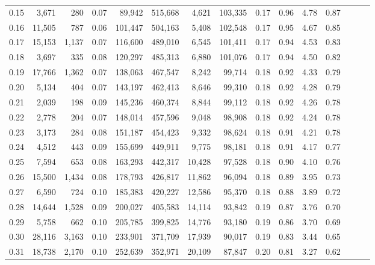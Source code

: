 \begin{tabular}{rrrrrrrrrrrrrrr}
0.15 &   3,671 &    280 &  0.07 &   89,942 &  515,668 &    4,621 &  103,335 &  0.17 &  0.96 &  4.78 &      0.87 \\
0.16 &  11,505 &    787 &  0.06 &  101,447 &  504,163 &    5,408 &  102,548 &  0.17 &  0.95 &  4.67 &      0.85 \\
0.17 &  15,153 &  1,137 &  0.07 &  116,600 &  489,010 &    6,545 &  101,411 &  0.17 &  0.94 &  4.53 &      0.83 \\
0.18 &   3,697 &    335 &  0.08 &  120,297 &  485,313 &    6,880 &  101,076 &  0.17 &  0.94 &  4.50 &      0.82 \\
0.19 &  17,766 &  1,362 &  0.07 &  138,063 &  467,547 &    8,242 &   99,714 &  0.18 &  0.92 &  4.33 &      0.79 \\
0.20 &   5,134 &    404 &  0.07 &  143,197 &  462,413 &    8,646 &   99,310 &  0.18 &  0.92 &  4.28 &      0.79 \\
0.21 &   2,039 &    198 &  0.09 &  145,236 &  460,374 &    8,844 &   99,112 &  0.18 &  0.92 &  4.26 &      0.78 \\
0.22 &   2,778 &    204 &  0.07 &  148,014 &  457,596 &    9,048 &   98,908 &  0.18 &  0.92 &  4.24 &      0.78 \\
0.23 &   3,173 &    284 &  0.08 &  151,187 &  454,423 &    9,332 &   98,624 &  0.18 &  0.91 &  4.21 &      0.78 \\
0.24 &   4,512 &    443 &  0.09 &  155,699 &  449,911 &    9,775 &   98,181 &  0.18 &  0.91 &  4.17 &      0.77 \\
0.25 &   7,594 &    653 &  0.08 &  163,293 &  442,317 &   10,428 &   97,528 &  0.18 &  0.90 &  4.10 &      0.76 \\
0.26 &  15,500 &  1,434 &  0.08 &  178,793 &  426,817 &   11,862 &   96,094 &  0.18 &  0.89 &  3.95 &      0.73 \\
0.27 &   6,590 &    724 &  0.10 &  185,383 &  420,227 &   12,586 &   95,370 &  0.18 &  0.88 &  3.89 &      0.72 \\
0.28 &  14,644 &  1,528 &  0.09 &  200,027 &  405,583 &   14,114 &   93,842 &  0.19 &  0.87 &  3.76 &      0.70 \\
0.29 &   5,758 &    662 &  0.10 &  205,785 &  399,825 &   14,776 &   93,180 &  0.19 &  0.86 &  3.70 &      0.69 \\
0.30 &  28,116 &  3,163 &  0.10 &  233,901 &  371,709 &   17,939 &   90,017 &  0.19 &  0.83 &  3.44 &      0.65 \\
0.31 &  18,738 &  2,170 &  0.10 &  252,639 &  352,971 &   20,109 &   87,847 &  0.20 &  0.81 &  3.27 &      0.62 \\

\end{tabular}
